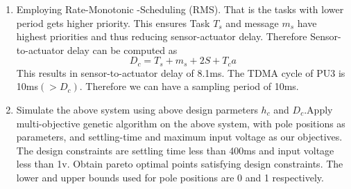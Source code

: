\begin{enumerate}
\item Employing Rate-Monotonic -Scheduling (RMS). That is the tasks with lower period gets higher priority. This ensures Task $T_s$ and message $m_s$ have highest priorities and thus reducing sensor-actuator delay. Therefore Sensor-to-actuator delay can be computed as 
$$D_c=T_s+m_s+2S+T_ca$$ This results in sensor-to-actuator delay of 8.1ms.
The TDMA cycle of PU3 is 10ms$(>D_c)$. Therefore we can have a sampling period of 10ms.
\item Simulate the above system using above design parmeters $h_c$ and $D_c$.Apply multi-objective genetic algorithm on the above system, with pole positions as parameters, and settling-time and maximum input voltage as our objectives. The design constraints are settling time less than 400ms and input voltage less than 1v. Obtain pareto optimal points satisfying design constraints.  The lower and upper bounds used for pole positions are 0 and 1 respectively.
\end{enumerate}

